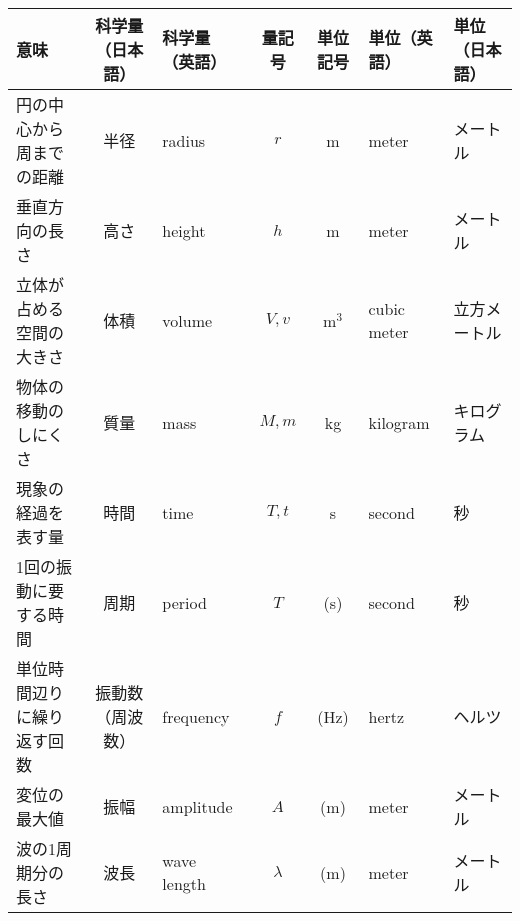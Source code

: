 \documentclass[b5j, landscape]{jarticle}
\begin{document}
\vfill
\begin{tabular}{|l|c|l|c|c|l|l|}\hline
\hfil 意味	&科学量（日本語）				&\hfil 科学量（英語）				&量記号				&単位記号		&\hfil 単位（英語）					&\hfil 単位（日本語）\\ \hline
円の中心から周までの距離	&半径				&radius					&$r$				&m		&meter						&メートル \\ \hline
垂直方向の長さ	&高さ				&height					&$h$				&m		&meter						&メートル \\ \hline
立体が占める空間の大きさ	&体積				&volume					&$V, v$				&m$^3$	&cubic meter				&立方メートル \\ \hline
物体の移動のしにくさ	&質量				&mass					&$M, m$				&kg		&kilogram					&キログラム \\ \hline
現象の経過を表す量	&時間				&time					&$T, t$				&s		&second						&秒 \\ \hline
1回の振動に要する時間	&周期				&period			&$T$				&(s)		&second						&秒 \\ \hline
単位時間辺りに繰り返す回数	&振動数（周波数）	&frequency			&$f$				&(Hz)		&hertz						&ヘルツ \\ \hline
変位の最大値	&振幅				&amplitude		&$A$				&(m)		&meter						&メートル \\ \hline
波の1周期分の長さ	&波長				&wave length		&$\lambda$			&(m)		&meter						&メートル \\ \hline
\end{tabular}
\end{document}
